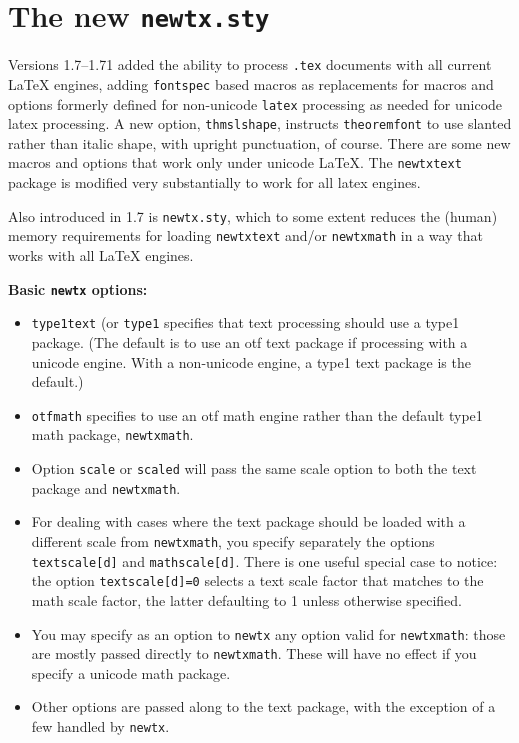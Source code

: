 \documentclass[\fsc]{article}
\theoremstyle{oldplain}
\theoremstyle{plain}
\begin{document}
\section{The new {\tt newtx.sty}}
Versions 1.7--1.71 added the ability to process {\tt.tex} documents with all current LaTeX engines, adding {\tt fontspec} based macros as replacements for macros and options formerly defined for non-unicode {\tt latex} processing as needed for unicode latex processing. A new option, {\tt thmslshape}, instructs {\tt theoremfont} to use slanted rather than italic shape, with upright punctuation, of course. There are some new macros and options that work only under unicode LaTeX. The {\tt newtxtext} package is modified very substantially to work for all latex engines. 

Also introduced in 1.7 is {\tt newtx.sty}, which to some extent reduces the (human) memory requirements for loading {\tt newtxtext} and/or {\tt newtxmath} in a way that works with all LaTeX engines. 

\textbf{Basic {\tt newtx} options:}
 
\begin{itemize}
\item
{\tt type1text} (or {\tt type1} specifies that text processing should use a type1 package. (The default is to use an otf text package if processing with a unicode engine. With a non-unicode engine, a type1 text package is the default.)
\item {\tt otfmath} specifies to use an otf math engine rather than the default type1 math package, {\tt newtxmath}.
\item Option {\tt scale} or {\tt scaled} will pass the same {scale} option to both the text package and  {\tt newtxmath}.
\item For dealing with cases where the text package should be loaded with a different scale from {\tt newtxmath}, you specify separately the options {\tt textscale[d]} and {\tt mathscale[d]}. There is one useful special case to notice: the option {\tt textscale[d]=0} selects a text scale factor that matches to the math scale factor, the latter defaulting to 1 unless otherwise specified.
\item You may specify as an option to {\tt newtx} any option valid for {\tt newtxmath}: those are mostly passed directly to {\tt newtxmath}. These will have no effect if you specify a unicode math package.
\item Other options are passed along to the text package, with the exception of a few  handled by {\tt newtx}.
\end{itemize}
\end{document}
